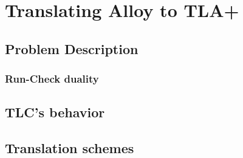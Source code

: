 \chapter{Translating Alloy to TLA+}

\section{Problem Description}


\subsection{Run-Check duality}


\section{TLC's behavior}



\section{Translation schemes}







